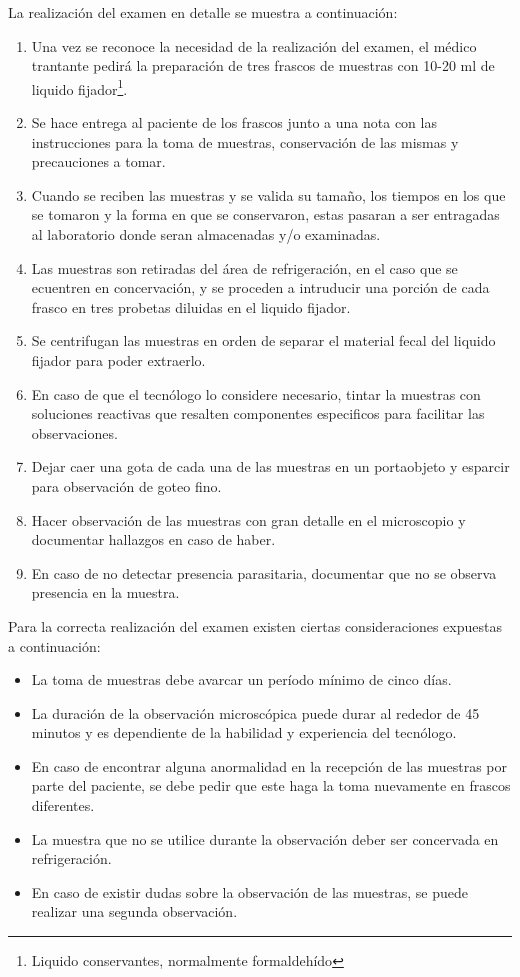 \documentclass[letter,12pt]{report}
\begin{document}
La realización del examen en detalle se muestra a continuación:
\begin{enumerate}
    \item Una vez se reconoce la necesidad de la realización del examen, el médico
        trantante pedirá la preparación de tres frascos de muestras con 10-20 ml de
        liquido fijador\footnote{Liquido conservantes, normalmente formaldehído}.
    \item Se hace entrega al paciente de los frascos junto a una nota con las
        instrucciones para la toma de muestras, conservación de las mismas y precauciones
        a tomar.
    \item Cuando se reciben las muestras y se valida su tamaño, los tiempos en los que se
        tomaron y la forma en que se conservaron, estas pasaran a ser entragadas al
        laboratorio donde seran almacenadas y/o examinadas.
    \item Las muestras son retiradas del área de refrigeración, en el caso que se
        ecuentren en concervación, y se proceden a intruducir una porción de cada frasco
        en tres probetas diluidas en el liquido fijador.
    \item Se centrifugan las muestras en orden de separar el material fecal del liquido
        fijador para poder extraerlo.
    \item En caso de que el tecnólogo lo considere necesario, tintar la muestras con
        soluciones reactivas que resalten componentes especificos para facilitar las
        observaciones.
    \item Dejar caer una gota de cada una de las muestras en un portaobjeto y esparcir
        para observación de goteo fino.
    \item Hacer observación de las muestras con gran detalle en el microscopio y
        documentar hallazgos en caso de haber.
    \item En caso de no detectar presencia parasitaria, documentar que no se observa
        presencia en la muestra.
\end{enumerate}

Para la correcta realización del examen existen ciertas consideraciones expuestas a
continuación:
\begin{itemize}
    \item La toma de muestras debe avarcar un período mínimo de cinco días.
    \item La duración de la observación microscópica puede durar al rededor de 45
        minutos y es dependiente de la habilidad y experiencia del tecnólogo.
    \item En caso de encontrar alguna anormalidad en la recepción de las muestras por
        parte del paciente, se debe pedir que este haga la toma nuevamente en frascos
        diferentes.
    \item La muestra que no se utilice durante la observación deber ser concervada en
        refrigeración.
    \item En caso de existir dudas sobre la observación de las muestras, se puede
        realizar una segunda observación.
\end{itemize}
\end{document}
